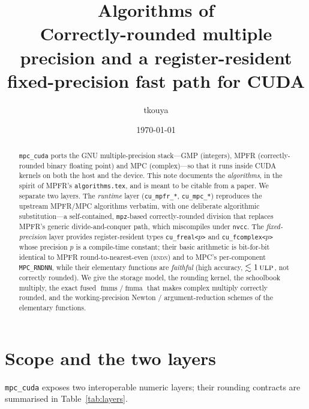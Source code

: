 \documentclass[11pt,a4paper]{article}
\title{\textbf{Algorithms of \code{mpc\_cuda}}\\[2pt]
{\large Correctly-rounded multiple precision and a register-resident\\
fixed-precision fast path for CUDA}}
\author{tkouya}
\date{\today}
\newcommand{\code}[1]{\texttt{#1}}
\newcommand{\PB}{\ensuremath{p}}
\newcommand{\ulp}{\textsc{ulp}}
\newcommand{\rndn}{\textsc{rndn}}
\newcommand{\fmma}{\ensuremath{\operatorname{fmma}}}
\newcommand{\fmms}{\ensuremath{\operatorname{fmms}}}
\begin{document}
\maketitle

\begin{abstract}
\noindent
\code{mpc\_cuda} ports the GNU multiple-precision stack---GMP (integers), MPFR
(correctly-rounded binary floating point) and MPC (complex)---so that it runs
inside CUDA kernels on both the host and the device. This note documents the
\emph{algorithms}, in the spirit of MPFR's \texttt{algorithms.tex}, and is meant
to be citable from a paper. We separate two layers. The \emph{runtime} layer
(\code{cu\_mpfr\_*}, \code{cu\_mpc\_*}) reproduces the upstream MPFR/MPC
algorithms verbatim, with one deliberate algorithmic substitution---a
self-contained, \code{mpz}-based correctly-rounded division that replaces MPFR's
generic divide-and-conquer path, which miscompiles under \code{nvcc}. The
\emph{fixed-precision} layer provides register-resident types
\code{cu\_freal<\PB>} and \code{cu\_fcomplex<\PB>} whose precision \PB{} is a
compile-time constant; their basic arithmetic is bit-for-bit identical to MPFR
round-to-nearest-even (\rndn) and to MPC's per-component \code{MPC\_RNDNN}, while
their elementary functions are \emph{faithful} (high accuracy, $\lesssim 1\,\ulp$,
not correctly rounded). We give the storage model, the rounding kernel, the
schoolbook multiply, the exact fused \fmms{}/\fmma{} that makes complex multiply
correctly rounded, and the working-precision Newton / argument-reduction schemes
of the elementary functions.
\end{abstract}

\tableofcontents

\section{Scope and the two layers}
\label{sec:scope}

\code{mpc\_cuda} exposes two interoperable numeric layers; their rounding
contracts are summarised in Table~\ref{tab:layers}.
\end{document}
